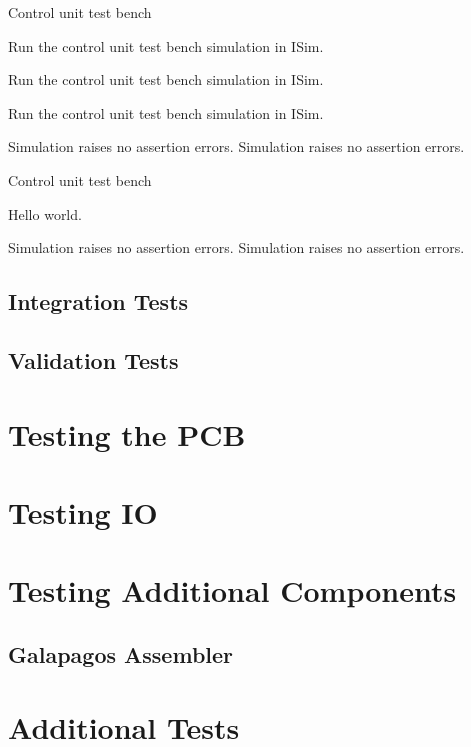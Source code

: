 \test
{Control unit test bench}{
    \item{Run the control unit test bench simulation in ISim.}
    \item{Run the control unit test bench simulation in ISim.}
    \item{Run the control unit test bench simulation in ISim.}
}{Simulation raises no assertion errors.}
{Simulation raises no assertion errors.}

\test
{Control unit test bench}
{
\item{Hello world.}
}
{Simulation raises no assertion errors.}
{Simulation raises no assertion errors.}

\subsection{Integration Tests}


\subsection{Validation Tests}

\section{Testing the PCB}


\section{Testing IO}

\section{Testing Additional Components}

\subsection{Galapagos Assembler}


\section{Additional Tests}

